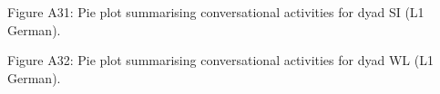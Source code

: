 \begin{stylecaption}
  
 
\end{stylecaption}

\begin{stylecaption}
Figure A31: Pie plot summarising conversational activities for dyad SI (L1 German).
\end{stylecaption}

\begin{stylecaption}
  
 
\end{stylecaption}

\begin{stylecaption}
Figure A32: Pie plot summarising conversational activities for dyad WL (L1 German).
\end{stylecaption}
